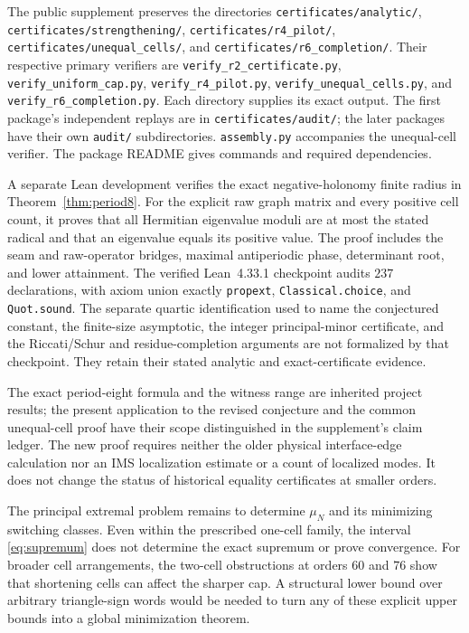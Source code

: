 \begingroup\raggedright
The public supplement preserves the directories
\nolinkurl{certificates/analytic/},
\nolinkurl{certificates/strengthening/},
\nolinkurl{certificates/r4_pilot/},
\nolinkurl{certificates/unequal_cells/}, and
\nolinkurl{certificates/r6_completion/}.
Their respective primary verifiers are
\nolinkurl{verify_r2_certificate.py},
\nolinkurl{verify_uniform_cap.py},
\nolinkurl{verify_r4_pilot.py},
\nolinkurl{verify_unequal_cells.py}, and
\nolinkurl{verify_r6_completion.py}.
Each directory supplies its exact output. The first package's independent
replays are in \nolinkurl{certificates/audit/}; the later packages have their
own \nolinkurl{audit/} subdirectories.
\nolinkurl{assembly.py} accompanies the unequal-cell verifier.
The package README gives commands and required dependencies.
\par\endgroup

A separate Lean development verifies the exact negative-holonomy finite
radius in Theorem~\ref{thm:period8}. For the explicit raw graph matrix and
every positive cell count, it proves that all Hermitian eigenvalue moduli
are at most the stated radical and that an eigenvalue equals its positive
value. The proof includes the seam and raw-operator bridges, maximal
antiperiodic phase, determinant root, and lower attainment. The verified
Lean~4.33.1 checkpoint audits $237$ declarations, with axiom union exactly
\texttt{propext}, \texttt{Classical.choice}, and \texttt{Quot.sound}.
The separate quartic identification used to name the conjectured constant,
the finite-size asymptotic, the integer principal-minor certificate, and
the Riccati/Schur and residue-completion arguments are not formalized by
that checkpoint. They retain their stated analytic and exact-certificate
evidence.

The exact period-eight formula and the witness range are inherited
project results; the present application to the revised conjecture and the
common unequal-cell proof have their scope distinguished in the supplement's
claim ledger. The new proof requires neither the older physical
interface-edge calculation nor an IMS localization estimate or a count of
localized modes. It does not change the status of historical equality
certificates at smaller orders.

The principal extremal problem remains to determine $\mu_N$ and its
minimizing switching classes. Even within the prescribed one-cell family,
the interval \eqref{eq:supremum} does not determine the exact supremum or
prove convergence. For broader cell arrangements, the two-cell
obstructions at orders $60$ and $76$ show that shortening cells can affect
the sharper cap. A structural lower bound over arbitrary triangle-sign
words would be needed to turn any of these explicit upper bounds into a
global minimization theorem.
